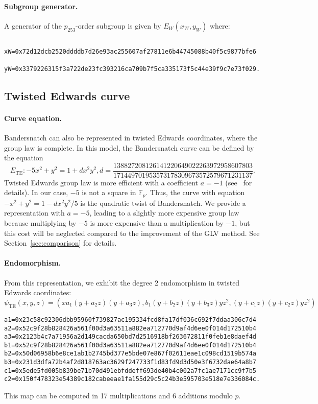 \documentclass{article}
\newcommand{\Fp}{\ensuremath{\mathbb F_p}}
\theoremstyle{definition}
\begin{document}
\paragraph{Subgroup generator.}
A generator of the $p_{253}$-order subgroup is given by $E_W(x_W,y_W)$
where:
\begin{verbatim}
  xW=0x72d12dcb2520ddddb7d26e93ac255607af27811e6b44745088b40f5c9877bfe6
  yW=0x3379226315f3a722de23fc393216ca709b7f5ca335173f5c44e39f9c7e73f029.
\end{verbatim}

\subsection{Twisted Edwards curve}
\paragraph{Curve equation.}
Bandersnatch can also be represented in twisted Edwards coordinates,
where the group law is complete.
In this model, the Bandersnatch curve can be defined by the equation
$$E_\text{TE}:-5x^2+y^2 = 1 +
dx^2y^2, d=\frac{138827208126141220649022263972958607803}{171449701953573178309673572579671231137}.$$
Twisted Edwards group law is more efficient with a coefficient
$a = -1$ (see~\cite{AC:HWCD08} for details).
In our case, $-5$ is not a square in $\Fp$. Thus, the curve with
equation $-x^2+y^2 = 1 -dx^2y^2/5$ is the quadratic twist of
Bandersnatch. We provide a representation with $a=-5$, leading to a
slightly more expensive group law because multiplying by $-5$ is more
expensive than a multiplication by $-1$, but this cost will be
neglected compared to the improvement of the GLV method. See
Section~\ref{sec:comparison} for details.

\paragraph{Endomorphism.}
From this representation, we exhibit the degree $2$ endomorphism in
twisted Edwards coordinates:
$$\psi_\text{TE}(x,y,z) = (xa_1(y+a_2z)(y+a_3z), b_1(y+b_2z)(y+b_3z)yz^2,
(y+c_1z)(y+c_2z)yz^2)$$
\begin{verbatim}
a1=0x23c58c92306dbb95960f739827ac195334fcd8fa17df036c692f7ddaa306c7d4
a2=0x52c9f28b828426a561f00d3a63511a882ea712770d9af4d6ee0f014d172510b4
a3=0x2123b4c7a71956a2d149cacda650bd7d2516918bf263672811f0feb1e8daef4d
b1=0x52c9f28b828426a561f00d3a63511a882ea712770d9af4d6ee0f014d172510b4
b2=0x50d06958b6e8ce1ab1b2745bd377e5bde07e867f02611eae1c098cd1519b574a
b3=0x231d3dfa72b4af2d818763ac3629f247733f1d83fd9d3d50e3f6732dae64a8b7
c1=0x5ede5fd005b839be71b70d491ebfddeff693de40b4c002a7fc1ae7171cc9f7b5
c2=0x150f478323e54389c182cabeeae1fa155d29c5c24b3e595703e518e7e336084c.
\end{verbatim}
This map can be computed in 17 multiplications and 6 additions modulo $p$.
\end{document}
